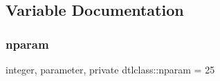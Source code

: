 \subsection{Variable Documentation}
\mbox{\label{namespacedtlclass_adf04761c96168c3dc492c89c72194cea}} 
\subsubsection{\texorpdfstring{nparam}{nparam}}
{\footnotesize\ttfamily integer, parameter, private dtlclass\+::nparam = 25\hspace{0.3cm}{\ttfamily [private]}}

